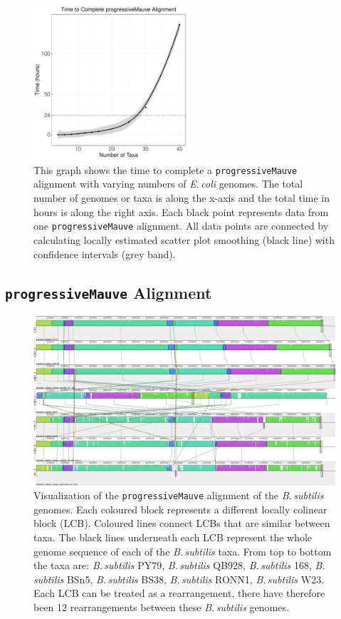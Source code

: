 \documentclass[11pt]{article}
\newcommand{\ecol}{\textit{E.\,coli}\xspace}
\newcommand{\bass}{\textit{B.\,subtilis}\xspace}
\newcommand{\p}{\texttt{progressiveMauve}\xspace}
\begin{document}
\begin{figure}[H]
	\begin{center}
		\includegraphics[width=0.51\textwidth]{./figs/mauve_time_plot}
		\caption{\label{fig:mauvetimeplot} This graph shows the time to complete a \p alignment with varying numbers of \ecol genomes. The total number of genomes or taxa is along the x-axis and the total time in hours is along the right axis. Each black point represents data from one \p alignment. All data points are connected by calculating locally estimated scatter plot smoothing (black line) with confidence intervals (grey band).}
	\end{center}
\end{figure}


\subsection{\p Alignment}
\begin{figure}[H]
	\begin{center}
		\includegraphics[width=\textwidth]{./figs/Bacillus_alignment_mauve.jpg}
		\caption{\label{fig:mauvealn} Visualization of the \p alignment of the \bass genomes. Each coloured block represents a different locally colinear block (LCB). Coloured lines connect LCBs that are similar between taxa. The black lines underneath each LCB represent the whole genome sequence of each of the \bass taxa. From top to bottom the taxa are: \bass PY79, \bass QB928, \bass 168, \bass BSn5, \bass BS38, \bass RONN1, \bass W23.  Each LCB can be treated as a rearrangement, there have therefore been 12 rearrangements between these \bass genomes.}
	\end{center}
\end{figure}
\end{document}

